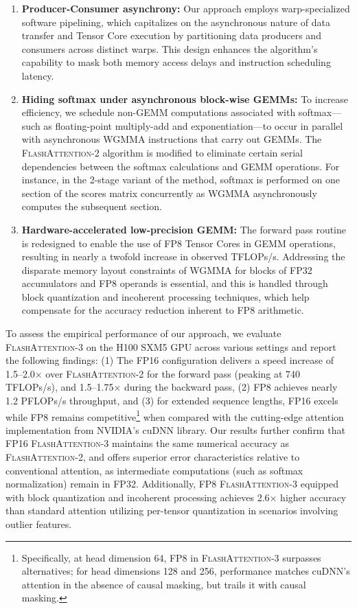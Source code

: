 \begin{enumerate}

\item \textbf{Producer-Consumer asynchrony:} Our approach employs warp-specialized software pipelining, which capitalizes on the asynchronous nature of data transfer and Tensor Core execution by partitioning data producers and consumers across distinct warps. This design enhances the algorithm's capability to mask both memory access delays and instruction scheduling latency.
\item \textbf{Hiding softmax under asynchronous block-wise GEMMs:} To increase efficiency, we schedule non-GEMM computations associated with softmax—such as floating-point multiply-add and exponentiation—to occur in parallel with asynchronous WGMMA instructions that carry out GEMMs. The \textsc{FlashAttention-2} algorithm is modified to eliminate certain serial dependencies between the softmax calculations and GEMM operations. For instance, in the 2-stage variant of the method, softmax is performed on one section of the scores matrix concurrently as WGMMA asynchronously computes the subsequent section.
\item \textbf{Hardware-accelerated low-precision GEMM:} The forward pass routine is redesigned to enable the use of FP8 Tensor Cores in GEMM operations, resulting in nearly a twofold increase in observed TFLOPs/s. Addressing the disparate memory layout constraints of WGMMA for blocks of FP32 accumulators and FP8 operands is essential, and this is handled through block quantization and incoherent processing techniques, which help compensate for the accuracy reduction inherent to FP8 arithmetic.
\end{enumerate}

To assess the empirical performance of our approach, we evaluate \textsc{FlashAttention-3} on the H100 SXM5 GPU across various settings and report the following findings: (1) The FP16 configuration delivers a speed increase of 1.5--2.0$\times$ over \textsc{FlashAttention-2} for the forward pass (peaking at 740 TFLOPs/s), and 1.5--1.75$\times$ during the backward pass, (2) FP8 achieves nearly 1.2 PFLOPs/s throughput, and (3) for extended sequence lengths, FP16 excels while FP8 remains competitive\footnote{Specifically, at head dimension 64, FP8 in \textsc{FlashAttention-3} surpasses alternatives; for head dimensions 128 and 256, performance matches cuDNN's attention in the absence of causal masking, but trails it with causal masking.} when compared with the cutting-edge attention implementation from NVIDIA's cuDNN library. Our results further confirm that FP16 \textsc{FlashAttention-3} maintains the same numerical accuracy as \textsc{FlashAttention-2}, and offers superior error characteristics relative to conventional attention, as intermediate computations (such as softmax normalization) remain in FP32. Additionally, FP8 \textsc{FlashAttention-3} equipped with block quantization and incoherent processing achieves 2.6$\times$ higher accuracy than standard attention utilizing per-tensor quantization in scenarios involving outlier features.


